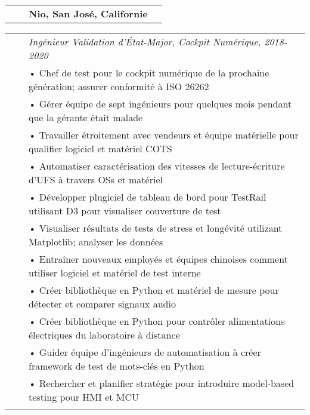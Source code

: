 \documentclass{minimal}
\begin{document}
\begin{tabular}{ p{1.5cm} p{1cm} p{16cm} >{\raggedleft\arraybackslash}p{3cm} }
& & \textbf{Nio, San José, Californie} & \\
\end{tabular}

\begin{tabular}{ p{1.5cm} p{1cm} p{16cm} }
& & \textit{Ingénieur Validation d'État-Major, Cockpit Numérique, 2018-2020}\\
& & • Chef de test pour le cockpit numérique de la prochaine génération; assurer conformité à ISO 26262\\
& & • Gérer équipe de sept ingénieurs pour quelques mois pendant que la gérante était malade\\
& & • Travailler étroitement avec vendeurs et équipe matérielle pour qualifier logiciel et matériel COTS\\
& & • Automatiser caractérisation des vitesses de lecture-écriture d'UFS à travers OSs et matériel\\
& & • Développer plugiciel de tableau de bord pour TestRail utilisant D3 pour visualiser couverture de test\\
& & • Visualiser résultats de tests de stress et longévité utilizant Matplotlib; analyser les données\\
& & • Entraîner nouveaux employés et équipes chinoises comment utiliser logiciel et matériel de test interne\\
& & • Créer bibliothèque en Python et matériel de mesure pour détecter et comparer signaux audio\\
& & • Créer bibliothèque en Python pour contrôler alimentations électriques du laboratoire à distance\\ 
& & • Guider équipe d'ingénieurs de automatisation à créer framework de test de mots-clés en Python\\
& & • Rechercher et planifier stratégie pour introduire model-based testing pour HMI et MCU\\
& & \\
\end{tabular}
\end{document}
